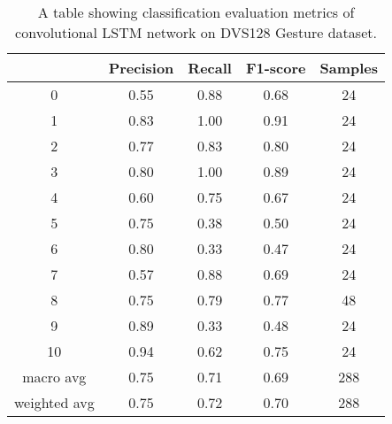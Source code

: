 \begin{table}[htb]
    \centering
    \begin{tabular}{|| c | c | c | c | c ||}
        \hline
             & Precision & Recall & F1-score & Samples \\
        \hline
        \hline
        0            & 0.55 & 0.88 & 0.68 & 24  \\
        \hline
        1            & 0.83 & 1.00 & 0.91 & 24  \\
        \hline
        2            & 0.77 & 0.83 & 0.80 & 24  \\
        \hline
        3            & 0.80 & 1.00 & 0.89 & 24  \\
        \hline
        4            & 0.60 & 0.75 & 0.67 & 24  \\
        \hline
        5            & 0.75 & 0.38 & 0.50 & 24  \\
        \hline
        6            & 0.80 & 0.33 & 0.47 & 24  \\
        \hline
        7            & 0.57 & 0.88 & 0.69 & 24  \\
        \hline
        8            & 0.75 & 0.79 & 0.77 & 48  \\
        \hline
        9            & 0.89 & 0.33 & 0.48 & 24  \\
        \hline
        10           & 0.94 & 0.62 & 0.75 & 24  \\
        \hline
        macro avg    & 0.75 & 0.71 & 0.69 & 288 \\
        \hline
        weighted avg & 0.75 & 0.72 & 0.70 & 288 \\
        \hline
    \end{tabular}
    \caption{A table showing classification evaluation metrics of convolutional LSTM network on DVS128 Gesture dataset.}
    \label{tab:conv_lstm_dvs128_evaluation_metrics}
\end{table}

